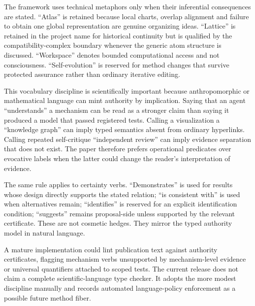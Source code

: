 The framework uses technical metaphors only when their inferential consequences are stated. ``Atlas'' is retained because local charts, overlap alignment and failure to obtain one global representation are genuine organizing ideas. ``Lattice'' is retained in the project name for historical continuity but is qualified by the compatibility-complex boundary whenever the generic atom structure is discussed. ``Workspace'' denotes bounded computational access and not consciousness. ``Self-evolution'' is reserved for method changes that survive protected assurance rather than ordinary iterative editing.

This vocabulary discipline is scientifically important because anthropomorphic or mathematical language can mint authority by implication. Saying that an agent ``understands'' a mechanism can be read as a stronger claim than saying it produced a model that passed registered tests. Calling a visualization a ``knowledge graph'' can imply typed semantics absent from ordinary hyperlinks. Calling repeated self-critique ``independent review'' can imply evidence separation that does not exist. The paper therefore prefers operational predicates over evocative labels when the latter could change the reader's interpretation of evidence.

The same rule applies to certainty verbs. ``Demonstrates'' is used for results whose design directly supports the stated relation; ``is consistent with'' is used when alternatives remain; ``identifies'' is reserved for an explicit identification condition; ``suggests'' remains proposal-side unless supported by the relevant certificate. These are not cosmetic hedges. They mirror the typed authority model in natural language.

A mature implementation could lint publication text against authority certificates, flagging mechanism verbs unsupported by mechanism-level evidence or universal quantifiers attached to scoped tests. The current release does not claim a complete scientific-language type checker. It adopts the more modest discipline manually and records automated language-policy enforcement as a possible future method fiber.
